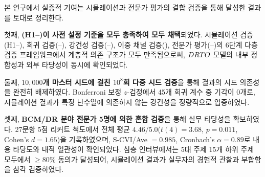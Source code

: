 \begin{p5add}
본 연구에서 실증적 기여는 시뮬레이션과 전문가 평가의 결합 검증을 통해 달성한
결과를 토대로 정리한다.

첫째, \textbf{(H1--)이 사전 설정 기준을 모두 충족하여 모두
채택}되었다. 시뮬레이션 검증(H1--), 회귀 검증(--), 강건성 검증(--),
이중 채널 검증(), 전문가 평가(--)의 6단계 다층 검증 프레임워크에서
계층적 의존 구조가 모두 만족됨으로써, $DRTO$ 모델의 내부 정합성과
외부 타당성이 동시에 확인되었다.

둘째, \textbf{$10{,}000$개 마스터 시드에 걸친 $10^8$회 다중 시드 검증}을
통해 결과의 시드 의존성을 완전히 배제하였다. Bonferroni 보정 $z$-검정에서
45개 회귀 계수 중 기각이 0개로, 시뮬레이션 결과가 특정 난수열에 의존하지 않는
강건성을 정량적으로 입증하였다.

셋째, \textbf{BCM/DR 분야 전문가 5명에 의한  혼합 검증}을 통해
실무 타당성을 확보하였다. 27문항 5점 리커트 척도에서 전체 평균
$4.46/5.0$($t(4) = 3.68$, $p = 0.011$, Cohen's $d = 1.65$)을 기록하였으며,
S-CVI/Ave $= 0.985$, Cronbach's $\alpha = 0.89$로 내용 타당도와 내적
일관성이 확인되었다. 심층 인터뷰에서는 5대 주제 15개 하위 주제 모두에서
$\geq 80\%$ 동의가 달성되어, 시뮬레이션 결과가 실무자의 경험적 관찰과
부합함을 삼각 검증하였다.

\end{p5add}
